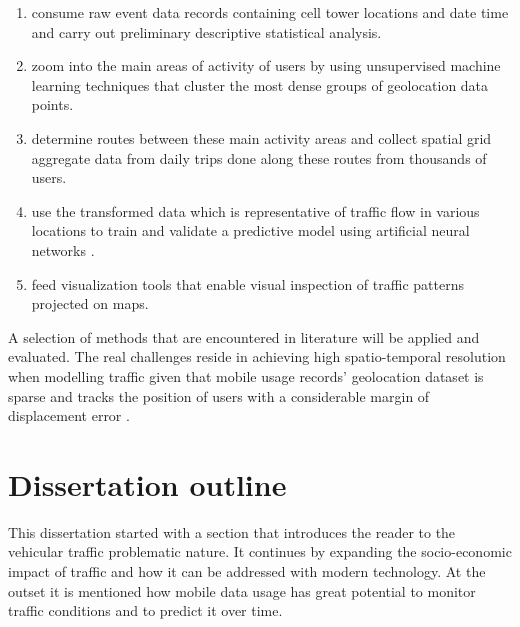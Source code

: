 \documentclass[12pt, a4paper]{report}
\theoremstyle{definition}
\theoremstyle{definition}%
\theoremstyle{definition}%
\theoremstyle{definition}%
\theoremstyle{definition}%
\theoremstyle{definition}%
\begin{document}
\begin{enumerate}
 \item consume raw event data records containing cell tower locations and date time and carry out preliminary descriptive statistical analysis. \label{objective:01}
 
 \item zoom into the main areas of activity of users by using unsupervised machine learning techniques that cluster the most dense groups of geolocation data points. \label{objective:02}
 
 \item  determine routes between these main activity areas and collect spatial grid aggregate data from daily trips done along these routes from thousands of users. \label{objective:03}
 
 \item use the transformed data which is representative of traffic flow in various locations to train and validate a predictive model using artificial neural networks \cite{Calabrese2013,Toole2015,Hoteit2014,Alexander2015}.  \label{objective:04}
 
 \item feed visualization tools that enable visual inspection of traffic patterns projected on maps. \label{objective:05}

\end{enumerate}

A selection of methods that are encountered in literature will be applied and evaluated. The real challenges reside in achieving high spatio-temporal resolution when modelling traffic given that mobile usage records' geolocation dataset is sparse and tracks the position of users with a considerable margin of displacement error \cite{Hoteit2014,Gonzalez2008}.



\section{Dissertation outline} \label{section:introduction:dissertation_outline}
This dissertation started with a section that introduces the reader to the vehicular traffic problematic nature. It continues by expanding the socio-economic impact of traffic and how it can be addressed with modern technology. At the outset it is mentioned how mobile data usage has great potential to monitor traffic conditions and to predict it over time.
\end{document}
